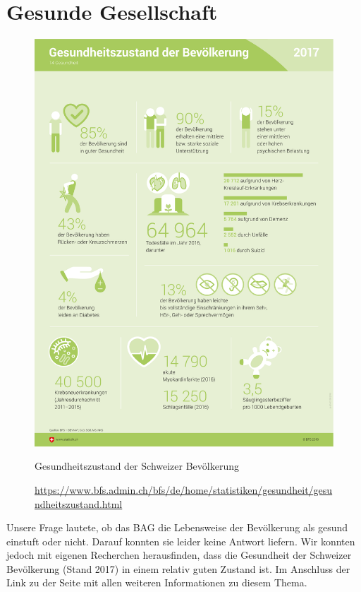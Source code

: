 \section{Gesunde Gesellschaft}
\begin{figure}
  \includegraphics[width=0.98\linewidth]{./images/gesundheitszustand_der_bevoelkerung.png}
  \caption{Gesundheitszustand der Schweizer Bevölkerung}
  \label{fig:gesundheitszustand}
  \caption*{\url{https://www.bfs.admin.ch/bfs/de/home/statistiken/gesundheit/gesundheitszustand.html}}
\end{figure}\leavevmode
Unsere Frage lautete, ob das BAG die Lebensweise der Bevölkerung als gesund einstuft oder nicht. Darauf konnten sie leider keine Antwort liefern. Wir konnten jedoch mit eigenen Recherchen herausfinden, dass die Gesundheit der Schweizer Bevölkerung (Stand 2017) in einem relativ guten Zustand ist. Im Anschluss der Link zu der Seite mit allen weiteren Informationen zu diesem Thema.
